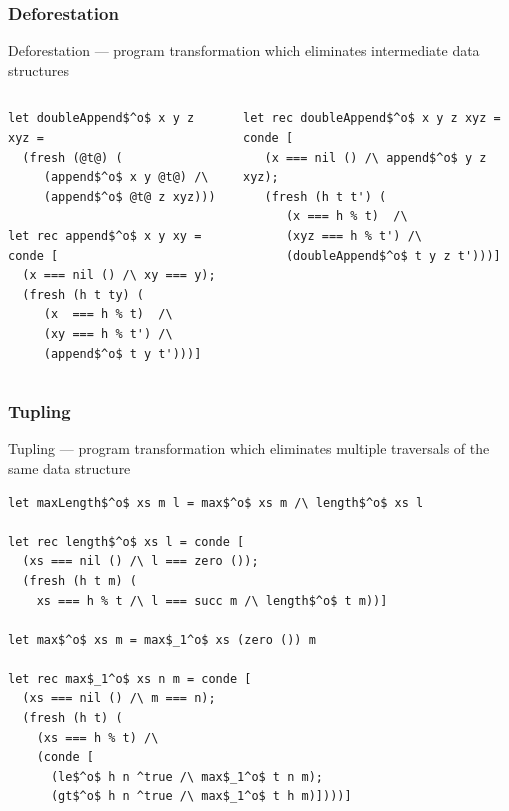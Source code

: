 \documentclass[xcolor=table]{beamer}
\begin{document}
\begin{frame}[fragile]
  \transwipe[direction=90]
  \frametitle{Deforestation}
Deforestation --- program transformation which eliminates intermediate data structures

\begin{columns}
\begin{column}{0.45\textwidth}
\begin{lstlisting}[basicstyle=\footnotesize]
let doubleAppend$^o$ x y z xyz = 
  (fresh (@t@) (
     (append$^o$ x y @t@) /\
     (append$^o$ @t@ z xyz)))

let rec append$^o$ x y xy = conde [
  (x === nil () /\ xy === y);
  (fresh (h t ty) (
     (x  === h % t)  /\  
     (xy === h % t') /\
     (append$^o$ t y t')))]
\end{lstlisting}
\end{column}
\begin{column}{0.55\textwidth}  
\begin{lstlisting}[basicstyle=\footnotesize]
let rec doubleAppend$^o$ x y z xyz = conde [
   (x === nil () /\ append$^o$ y z xyz);
   (fresh (h t t') (
      (x === h % t)  /\  
      (xyz === h % t') /\
      (doubleAppend$^o$ t y z t')))]
\end{lstlisting}
\end{column}
\end{columns}
\end{frame}

\begin{frame}[fragile]
  \transwipe[direction=90]
  \frametitle{Tupling}
Tupling --- program transformation which eliminates multiple traversals of the same data structure

\begin{lstlisting}[basicstyle=\footnotesize]
let maxLength$^o$ xs m l = max$^o$ xs m /\ length$^o$ xs l

let rec length$^o$ xs l = conde [
  (xs === nil () /\ l === zero ());
  (fresh (h t m) (
    xs === h % t /\ l === succ m /\ length$^o$ t m))]

let max$^o$ xs m = max$_1^o$ xs (zero ()) m

let rec max$_1^o$ xs n m = conde [
  (xs === nil () /\ m === n);
  (fresh (h t) (
    (xs === h % t) /\
    (conde [
      (le$^o$ h n ^true /\ max$_1^o$ t n m); 
      (gt$^o$ h n ^true /\ max$_1^o$ t h m)])))]
\end{lstlisting}

\end{frame}
\end{document}
